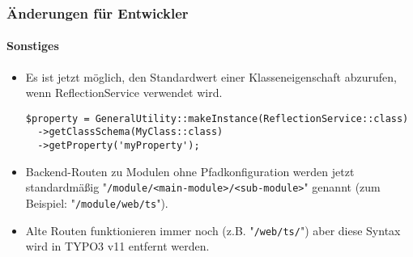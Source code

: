 \begin{frame}[fragile]
	\frametitle{Änderungen für Entwickler}
	\framesubtitle{Sonstiges}

	\lstset{basicstyle=\tiny\ttfamily}

	\begin{itemize}
		\item Es ist jetzt möglich, den Standardwert einer Klasseneigenschaft abzurufen,
			wenn ReflectionService verwendet wird.

\begin{lstlisting}
$property = GeneralUtility::makeInstance(ReflectionService::class)
  ->getClassSchema(MyClass::class)
  ->getProperty('myProperty');
\end{lstlisting}

		\item Backend-Routen zu Modulen ohne Pfadkonfiguration werden jetzt standardmäßig \newline
			"\texttt{/module/<main-module>/<sub-module>}" genannt\newline
			\small
				(zum Beispiel: "\texttt{/module/web/ts}").
			\normalsize

		\item Alte Routen funktionieren immer noch (z.B. "\texttt{/web/ts/}") aber diese Syntax wird in TYPO3 v11 entfernt werden.

	\end{itemize}

\end{frame}


